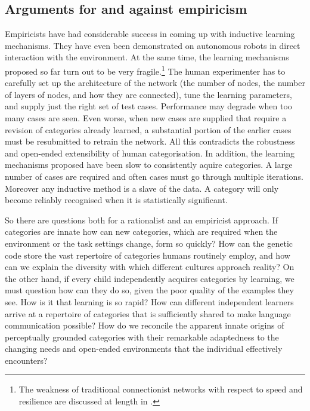 \subsection{Arguments for and against empiricism}

Empiricists have had considerable
success in coming up with inductive learning mechanisms. 
They have even been demonstrated on autonomous robots 
in direct interaction with the environment.
At the same time, the learning mechanisms proposed so far turn out
to be very fragile.\footnote{
The weakness of traditional connectionist networks
with respect to speed and resilience
are discussed at length in \cite{Quartz:1997}.}
The human experimenter has to carefully 
set up the architecture of the network (the number of
nodes, the number of layers of nodes, and how they are
connected), tune the learning
parameters, and supply just the right set of test cases. 
Performance may degrade when too many cases are seen. 
Even worse, when new cases are supplied that require
a revision of categories already learned, a substantial
portion of the earlier cases must be resubmitted to 
retrain the network. All this contradicts
the robustness and open-ended extensibility
of human categorisation. In addition, 
the learning mechanisms proposed have been
slow to consistently aquire categories. A large number of cases
are required and often 
cases must go through multiple iterations. Moreover 
any inductive method is a slave of
the data. A category will only become reliably recognised
when it is statistically significant. 

So there are questions both for a rationalist and an 
empiricist approach. If categories are innate how can
new categories, which are required when the environment
or the task settings change, form so quickly?
How can the genetic code store the vast repertoire 
of categories humans routinely 
employ, and how can we explain the diversity with which different
cultures approach reality? On the other hand, if every 
child independently acquires categories by learning, we 
must question how 
can they do so, given the poor quality of the examples 
they see. How is it that learning is so rapid? How can different
independent learners arrive at a repertoire of categories
that is sufficiently shared to make language communication
possible? How do we reconcile the apparent 
innate origins of perceptually 
grounded categories with their remarkable adaptedness to the 
changing needs and open-ended environments that the individual
effectively encounters? 

